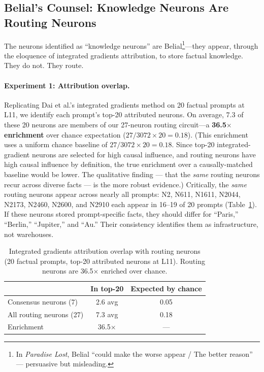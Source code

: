\documentclass{article}
\begin{document}
\subsection{Belial's Counsel: Knowledge Neurons Are Routing Neurons}
\label{sec:knowledge_neurons}

The neurons \citet{dai2022knowledge} identified as ``knowledge neurons'' are
Belial\footnote{In \emph{Paradise Lost}, Belial ``could make the worse appear /
The better reason'' --- persuasive but misleading.}---they appear, through the
eloquence of integrated gradients attribution, to store factual knowledge.
They do not. They route.

\paragraph{Experiment 1: Attribution overlap.}
Replicating Dai et al.'s integrated gradients method on 20 factual prompts
at L11, we identify each prompt's top-20 attributed neurons.
On average, 7.3 of these 20 neurons are members of our 27-neuron routing
circuit---a \textbf{36.5$\times$ enrichment} over chance expectation
($27/3072 \times 20 = 0.18$).
(This enrichment uses a uniform chance baseline of $27/3072 \times 20 = 0.18$.
Since top-20 integrated-gradient neurons are selected for high causal influence,
and routing neurons have high causal influence by definition, the true enrichment
over a causally-matched baseline would be lower. The qualitative finding --- that
the \emph{same} routing neurons recur across diverse facts --- is the more robust
evidence.)
Critically, the \emph{same} routing neurons appear across nearly all prompts:
N2, N611, N1611, N2044, N2173, N2460, N2600, and N2910 each appear in 16--19
of 20 prompts (Table~\ref{tab:knowledge_neurons}).
If these neurons stored prompt-specific facts, they should differ for ``Paris,''
``Berlin,'' ``Jupiter,'' and ``Au.''
Their consistency identifies them as infrastructure, not warehouses.

\begin{table}[t]
\centering
\caption{Integrated gradients attribution overlap with routing neurons
(20 factual prompts, top-20 attributed neurons at L11).
Routing neurons are 36.5$\times$ enriched over chance.}
\label{tab:knowledge_neurons}
\begin{tabular}{@{}lcc@{}}
\toprule
& In top-20 & Expected by chance \\
\midrule
Consensus neurons (7) & 2.6 avg & 0.05 \\
All routing neurons (27) & 7.3 avg & 0.18 \\
Enrichment & 36.5$\times$ & --- \\
\bottomrule
\end{tabular}
\end{table}
\end{document}
